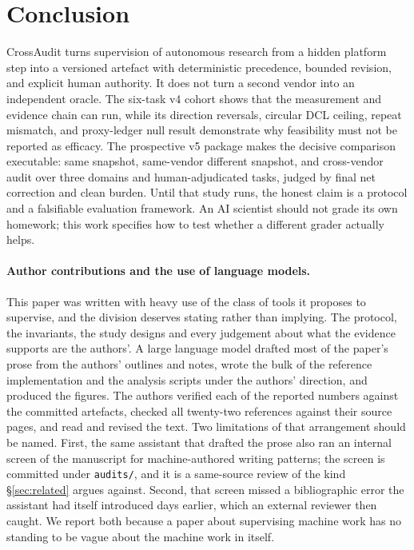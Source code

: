 \documentclass[11pt]{article}
\begin{document}
\section{Conclusion}\label{sec:conclusion}

CrossAudit turns supervision of autonomous research from a hidden platform step into a versioned artefact with deterministic precedence, bounded revision, and explicit human authority. It does not turn a second vendor into an independent oracle. The six-task v4 cohort shows that the measurement and evidence chain can run, while its direction reversals, circular DCL ceiling, repeat mismatch, and proxy-ledger null result demonstrate why feasibility must not be reported as efficacy. The prospective v5 package makes the decisive comparison executable: same snapshot, same-vendor different snapshot, and cross-vendor audit over three domains and human-adjudicated tasks, judged by final net correction and clean burden. Until that study runs, the honest claim is a protocol and a falsifiable evaluation framework. An AI scientist should not grade its own homework; this work specifies how to test whether a different grader actually helps.

\paragraph{Author contributions and the use of language models.} This paper was written with heavy use of the class of tools it proposes to supervise, and the division deserves stating rather than implying. The protocol, the invariants, the study designs and every judgement about what the evidence supports are the authors'. A large language model drafted most of the paper's prose from the authors' outlines and notes, wrote the bulk of the reference implementation and the analysis scripts under the authors' direction, and produced the figures. The authors verified each of the reported numbers against the committed artefacts, checked all twenty-two references against their source pages, and read and revised the text. Two limitations of that arrangement should be named. First, the same assistant that drafted the prose also ran an internal screen of the manuscript for machine-authored writing patterns; the screen is committed under \texttt{audits/}, and it is a same-source review of the kind \S\ref{sec:related} argues against. Second, that screen missed a bibliographic error the assistant had itself introduced days earlier, which an external reviewer then caught. We report both because a paper about supervising machine work has no standing to be vague about the machine work in itself.
\end{document}
